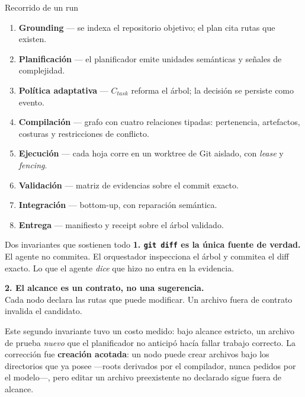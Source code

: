 \documentclass[10pt,aspectratio=169]{beamer}
\begin{document}
\begin{frame}{Recorrido de un run}
  \begin{enumerate}
    \item \textbf{Grounding} — se indexa el repositorio objetivo; el plan cita
      rutas que existen.
    \item \textbf{Planificación} — el planificador emite unidades semánticas y
      señales de complejidad.
    \item \textbf{Política adaptativa} — $C_{\mathit{task}}$ reforma el árbol;
      la decisión se persiste como evento.
    \item \textbf{Compilación} — grafo con cuatro relaciones tipadas:
      pertenencia, artefactos, costuras y restricciones de conflicto.
    \item \textbf{Ejecución} — cada hoja corre en un worktree de Git aislado,
      con \emph{lease} y \emph{fencing}.
    \item \textbf{Validación} — matriz de evidencias sobre el commit exacto.
    \item \textbf{Integración} — bottom-up, con reparación semántica.
    \item \textbf{Entrega} — manifiesto y receipt sobre el árbol validado.
  \end{enumerate}
\end{frame}

\begin{frame}{Dos invariantes que sostienen todo}
  \textbf{1. \texttt{git diff} es la única fuente de verdad.}\\
  El agente no commitea. El orquestador inspecciona el árbol y commitea el diff
  exacto. Lo que el agente \emph{dice} que hizo no entra en la evidencia.

  \bigskip
  \textbf{2. El alcance es un contrato, no una sugerencia.}\\
  Cada nodo declara las rutas que puede modificar. Un archivo fuera de contrato
  invalida el candidato.

  \bigskip
  \pause
  \small
  Este segundo invariante tuvo un costo medido: bajo alcance estricto, un
  archivo de prueba \emph{nuevo} que el planificador no anticipó hacía fallar
  trabajo correcto. La corrección fue \textbf{creación acotada}: un nodo puede
  crear archivos bajo los directorios que ya posee —roots derivados por el
  compilador, nunca pedidos por el modelo—, pero editar un archivo preexistente
  no declarado sigue fuera de alcance.
\end{frame}
\end{document}
